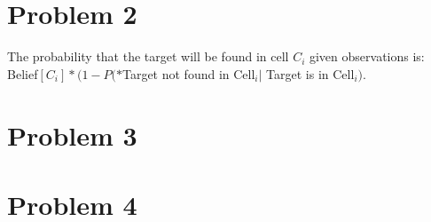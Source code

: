 \documentclass[12pt]{report}
\begin{document}
\section{Problem 2}
The probability that the target will be found in cell $C_{i}$ given observations is:\\
Belief$[C_{i}]*(1 - P(*$Target not found in Cell$_{i}|$ Target is in Cell$_{i})$.

\section{Problem 3}


\section{Problem 4}
\end{document}
